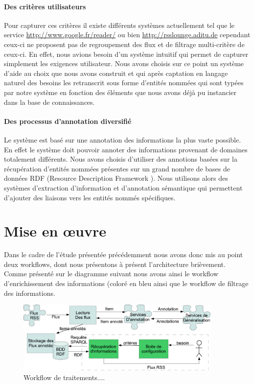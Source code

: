 \documentclass[]{easychair}
\begin{document}
\paragraph*{Des critères utilisateurs}
Pour capturer ces critères il existe différents systèmes actuellement tel que le service \url{http://www.google.fr/reader/} ou bien \url{http://rsslounge.aditu.de} cependant ceux-ci ne proposent pas de regroupement des flux et de filtrage multi-critère de ceux-ci.
En effet, nous avions besoin d'un système intuitif qui permet de capturer simplement les exigences utilisateur. Nous avons choisis sur ce point un système d'aide au choix que nous avons construit et qui après captation en langage naturel des besoins les retranscrit sous forme d'entités nommées qui sont typées par notre système en fonction des éléments que nous avons déjà pu instancier dans la base de connaissances.

\paragraph*{Des processus d'annotation diversifié}
Le système est basé sur une annotation des informations la plus vaste possible. En effet le système doit pouvoir annoter des informations provenant de domaines totalement différents.
Nous avons choisis d'utiliser des annotions basées sur la récupération d'entités nommées présentes sur un grand nombre de bases de données RDF (Resource Description Framework \cite{Winer2005}).
Nous utilisons alors des systèmes d'extraction d'information et d'annotation sémantique qui permettent d'ajouter des liaisons vers les entités nommés spécifiques.



\section{Mise en œuvre}
\label{sect:miseEnOuvre}
Dans le cadre de l'étude présentée précédemment nous avons donc mis au point deux workflows, dont nous présentons à présent l'architecture brièvement. Comme présenté sur le diagramme suivant nous avons ainsi le workflow d'enrichissement des informations (coloré en bleu ainsi que le workflow de filtrage des informations.

\begin{figure}[htb!]
	\begin{centering}
	\includegraphics[width=0.9\textwidth]{diagramme-Archi.png}
	\caption{Workflow de traitements....}
	\label{fig:mmFM}
	\end{centering}
\end{figure}
\end{document}
